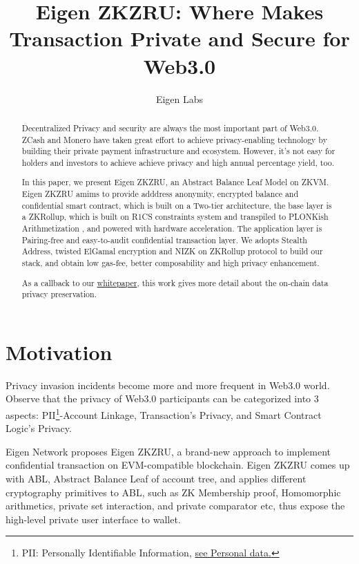\documentclass{article}
\title{Eigen ZKZRU: Where Makes Transaction Private and Secure for Web3.0}
\author{Eigen Labs}
\begin{document}
\maketitle



\begin{abstract}
Decentralized Privacy and security are always the most important part of Web3.0. ZCash and Monero have taken great effort to achieve privacy-enabling technology by building their private payment infrastructure and ecosystem. However, it's not easy for holders and investors to achieve achieve privacy and high annual percentage yield, too.

In this paper, we present Eigen ZKZRU, an Abstract Balance Leaf Model on ZKVM. Eigen ZKZRU amims to provide adddress anonymity, encrypted balance and confidential smart contract, which is built on a Two-tier architecture, the base layer is a ZKRollup, which is built on R1CS constraints system and transpiled to PLONKish Arithmetization \cite{gabizon2019plonk}, and powered with hardware acceleration. The application layer is Pairing-free and easy-to-audit confidential transaction layer. We adopts Stealth Address, twisted ElGamal encryption and NIZK on ZKRollup protocol to build our stack, and obtain low gas-fee, better composability and high privacy enhancement. 

As a callback to our \href{https://www.eigen.cash/#/}{whitepaper}, this work gives more detail about the on-chain data privacy preservation. 

\end{abstract}

\section{Motivation}

Privacy invasion incidents become more and more frequent in Web3.0 world. Observe that the privacy of Web3.0 participants can be categorized into 3 aspects: PII\footnote{PII: Personally Identifiable Information, \href{https://en.wikipedia.org/wiki/Personal_data}{see Personal data.}}-Account Linkage, Transaction's Privacy, and Smart Contract Logic's Privacy.

Eigen Network proposes Eigen ZKZRU, a brand-new approach to implement confidential transaction on EVM-compatible blockchain. Eigen ZKZRU comes up with ABL, Abstract Balance Leaf of account tree, and applies different cryptography primitives to ABL, such as ZK Membership proof, Homomorphic arithmetics, private set interaction, and private comparator etc, thus expose the high-level private user interface to wallet. 
\end{document}
